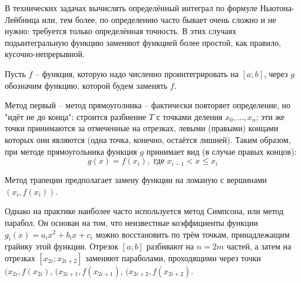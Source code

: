 В технических задачах вычислять определённый интеграл по формуле Ньютона-Лейбница или, тем более, по определению часто бывает очень сложно и не нужно: требуется только определённая точность.
В этих случаях подынтегральную функцию заменяют функцией более простой, как правило, кусочно-непрерывной.

Пусть $f$ -- функция, которую надо численно проинтегрировать на $[a;b]$, через $g$ обозначим функцию, которой будем заменять $f$.

Метод первый -- метод прямоуголника -- фактически повторяет определение, но "идёт не до конца":
строится разбиение $T$ с точками деления $x_0, ..., x_n$; эти же точки принимаются за отмеченные на отрезках, левыми (правыми) концами которых они являются (одна точка, конечно, остаётся лишней).
Таким образом, при методе прямоугольника функция $g$ принимает вид (в случае правых концов):
$$
g(x)=f(x_i), \mbox{~где~} x_{i-1}<x\leq x_i
$$

Метод трапеции предполагает замену функции на ломаную с вершинами $(x_i,f(x_i))$.

Однако на практике наиболее часто используется метод Симпсона, или метод парабол.
Он основан на том, что неизвестные коэффициенты функции $g_i(x)=a_i x^2 + b_i x + c_i$ можно восстановить по трём точкам, принадлежащим грайику этой функции.
Отрезок $[a;b]$ разбивают на $n=2m$ частей, а затем на отрезках $[x_{2i};x_{2i+2}]$ заменяют параболами, проходящими через точки $(x_{2i},f(x_{2i})$, $(x_{2i+1},f(x_{2i+1})$, $(x_{2i+2},f(x_{2i+2})$.



